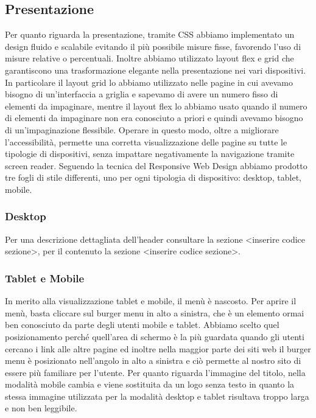 \documentclass[a4paper]{article}
\begin{document}
    \subsection{Presentazione}
    Per quanto riguarda la presentazione, tramite CSS abbiamo implementato un design fluido e scalabile evitando il più possibile misure fisse, favorendo l’uso di misure relative o percentuali. Inoltre abbiamo utilizzato layout flex e grid che garantiscono una trasformazione elegante nella presentazione nei vari dispositivi. In particolare il layout grid lo abbiamo utilizzato nelle pagine in cui avevamo bisogno di un’interfaccia a griglia e sapevamo di avere un numero fisso di elementi da impaginare, mentre il layout flex lo abbiamo usato quando il numero di elementi da impaginare non era conosciuto a priori e quindi avevamo bisogno di un’impaginazione flessibile. Operare in questo modo, oltre a migliorare l’accessibilità, permette una corretta visualizzazione delle pagine su tutte le tipologie di dispositivi, senza impattare negativamente la navigazione tramite screen reader. Seguendo la tecnica del Responsive Web Design abbiamo prodotto tre fogli di stile differenti, uno per ogni tipologia di dispositivo: desktop, tablet, mobile.

    \subsubsection{Desktop}
    Per una descrizione dettagliata dell’header consultare la sezione <inserire codice sezione>, per il contenuto la sezione <inserire codice sezione>.

    \subsubsection{Tablet e Mobile}
    In merito alla visualizzazione tablet e mobile, il menù è nascosto. Per aprire il menù, basta cliccare sul burger menu in alto a sinistra, che è un elemento ormai ben conosciuto da parte degli utenti mobile e tablet. Abbiamo scelto quel posizionamento perché quell’area di schermo è la più guardata quando gli utenti cercano i link alle altre pagine ed inoltre nella maggior parte dei siti web il burger menu è posizionato nell'angolo in alto a sinistra e ciò permette al nostro sito di essere più familiare per l’utente. Per quanto riguarda l’immagine del titolo, nella modalità mobile cambia e viene sostituita da un logo senza testo in quanto la stessa immagine utilizzata per la modalità desktop e tablet risultava troppo larga e non ben leggibile.
\end{document}
